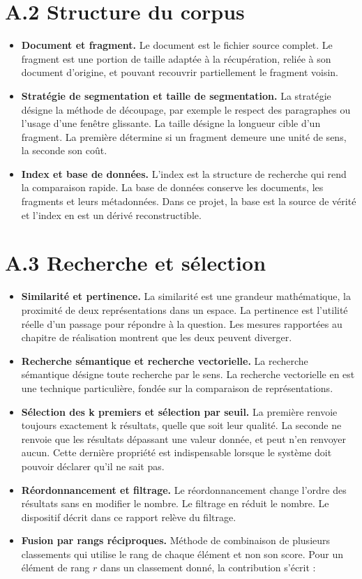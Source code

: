 \section*{A.2 Structure du corpus}

\begin{itemize}
  \item \textbf{Document et fragment.} Le document est le fichier source complet. Le fragment est une portion de taille adaptée à la récupération, reliée à son document d'origine, et pouvant recouvrir partiellement le fragment voisin.
  \item \textbf{Stratégie de segmentation et taille de segmentation.} La stratégie désigne la méthode de découpage, par exemple le respect des paragraphes ou l'usage d'une fenêtre glissante. La taille désigne la longueur cible d'un fragment. La première détermine si un fragment demeure une unité de sens, la seconde son coût.
  \item \textbf{Index et base de données.} L'index est la structure de recherche qui rend la comparaison rapide. La base de données conserve les documents, les fragments et leurs métadonnées. Dans ce projet, la base est la source de vérité et l'index en est un dérivé reconstructible.
\end{itemize}

\section*{A.3 Recherche et sélection}

\begin{itemize}
  \item \textbf{Similarité et pertinence.} La similarité est une grandeur mathématique, la proximité de deux représentations dans un espace. La pertinence est l'utilité réelle d'un passage pour répondre à la question. Les mesures rapportées au chapitre de réalisation montrent que les deux peuvent diverger.
  \item \textbf{Recherche sémantique et recherche vectorielle.} La recherche sémantique désigne toute recherche par le sens. La recherche vectorielle en est une technique particulière, fondée sur la comparaison de représentations.
  \item \textbf{Sélection des k premiers et sélection par seuil.} La première renvoie toujours exactement k résultats, quelle que soit leur qualité. La seconde ne renvoie que les résultats dépassant une valeur donnée, et peut n'en renvoyer aucun. Cette dernière propriété est indispensable lorsque le système doit pouvoir déclarer qu'il ne sait pas.
  \item \textbf{Réordonnancement et filtrage.} Le réordonnancement change l'ordre des résultats sans en modifier le nombre. Le filtrage en réduit le nombre. Le dispositif décrit dans ce rapport relève du filtrage.
  \item \textbf{Fusion par rangs réciproques.} Méthode de combinaison de plusieurs classements qui utilise le rang de chaque élément et non son score. Pour un élément de rang $r$ dans un classement donné, la contribution s'écrit :
\end{itemize}

